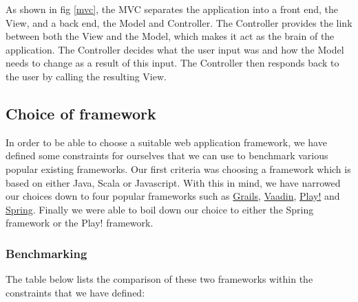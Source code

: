 As shown in fig \ref{mvc}, the MVC separates the application into a front end, the View, and a back end, the Model and Controller. The Controller provides the link between both the View and the Model, which makes it act as the brain of the application. The Controller decides what the user input was and how the Model needs to change as a result of this input\cite{codinghorror}. The Controller then responds back to the user by calling the resulting View.

\subsection{Choice of framework}
In order to be able to choose a suitable web application framework, we have defined some  constraints for ourselves that we can use to benchmark various popular existing frameworks. Our first criteria was choosing a framework which is based on either Java, Scala or Javascript. With this in mind, we have narrowed our choices down to four popular frameworks such as \href{https://grails.org/}{Grails}, \href{https://vaadin.com/home}{Vaadin}, \href{https://www.playframework.com/}{Play!} and \href{http://projects.spring.io/spring-framework/}{Spring}. Finally we were able to boil down our choice to either the Spring framework or the Play! framework.
\subsubsection{Benchmarking}
 The table below lists the comparison of these two frameworks within the constraints that we have defined:\\


